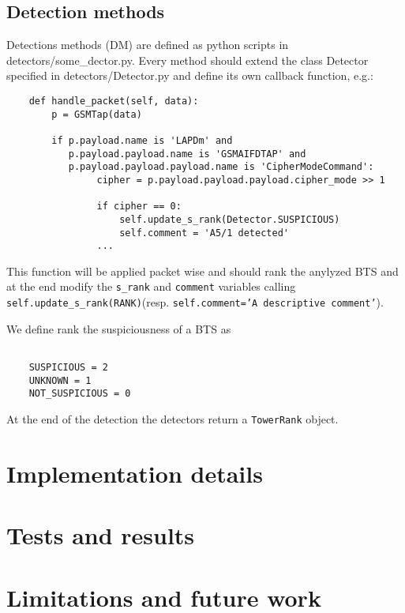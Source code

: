 \documentclass[preprint,12pt,3p]{elsarticle}
\begin{document}
\subsection{Detection methods}

Detections methods (DM) are defined as python scripts in detectors/some\_dector.py. Every method should extend the class Detector specified in detectors/Detector.py and define its own callback function, e.g.:
\lstset{language=Python}
\begin{lstlisting}
    def handle_packet(self, data):
        p = GSMTap(data)

        if p.payload.name is 'LAPDm' and
           p.payload.payload.name is 'GSMAIFDTAP' and
           p.payload.payload.payload.name is 'CipherModeCommand':
                cipher = p.payload.payload.payload.cipher_mode >> 1

                if cipher == 0:
                    self.update_s_rank(Detector.SUSPICIOUS)
                    self.comment = 'A5/1 detected'
                ...

\end{lstlisting}

This function will be applied packet wise and should rank the anylyzed BTS and at the end modify the \texttt{s\_rank} and \texttt{comment} variables calling \texttt{self.update\_s\_rank(RANK)}(resp. \texttt{self.comment='A descriptive comment'}).

We define rank the suspiciousness of a BTS as
\begin{lstlisting}

    SUSPICIOUS = 2
    UNKNOWN = 1
    NOT_SUSPICIOUS = 0
\end{lstlisting}

At the end of the detection the detectors return a \texttt{TowerRank} object.




\section{Implementation details}
\section{Tests and results}
\section{Limitations and future work}
\end{document}
